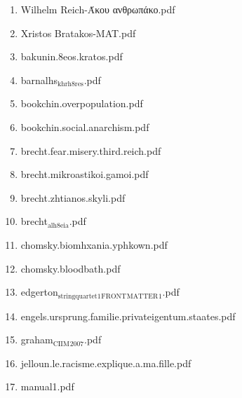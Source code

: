 \documentclass[11pt]{article}
\begin{document}
\begin{enumerate}
\begin{enumerate}
\item Wilhelm Reich-Άκου ανθρωπάκο.pdf
\label{sec-1-1-1-1-49-2-2-1-41}

\item Xristos Bratakos-MAT.pdf
\label{sec-1-1-1-1-49-2-2-1-42}

\item bakunin.8eos.kratos.pdf
\label{sec-1-1-1-1-49-2-2-1-43}

\item barnalhs$_{\text{khrh8res}}$.pdf
\label{sec-1-1-1-1-49-2-2-1-44}

\item bookchin.overpopulation.pdf
\label{sec-1-1-1-1-49-2-2-1-45}

\item bookchin.social.anarchism.pdf
\label{sec-1-1-1-1-49-2-2-1-46}

\item brecht.fear.misery.third.reich.pdf
\label{sec-1-1-1-1-49-2-2-1-47}

\item brecht.mikroastikoi.gamoi.pdf
\label{sec-1-1-1-1-49-2-2-1-48}

\item brecht.zhtianos.skyli.pdf
\label{sec-1-1-1-1-49-2-2-1-49}

\item brecht$_{\text{alh8eia}}$.pdf
\label{sec-1-1-1-1-49-2-2-1-50}

\item chomsky.biomhxania.yphkown.pdf
\label{sec-1-1-1-1-49-2-2-1-51}

\item chomsky.bloodbath.pdf
\label{sec-1-1-1-1-49-2-2-1-52}

\item edgerton$_{\text{stringquartet1}}$$_{\text{FRONT}}$$_{\text{MATTER}}$$_{\text{1}}$.pdf
\label{sec-1-1-1-1-49-2-2-1-53}

\item engels.ursprung.familie.privateigentum.staates.pdf
\label{sec-1-1-1-1-49-2-2-1-54}

\item graham$_{\text{CIIM}}$$_{\text{2007}}$.pdf
\label{sec-1-1-1-1-49-2-2-1-55}

\item jelloun.le.racisme.explique.a.ma.fille.pdf
\label{sec-1-1-1-1-49-2-2-1-56}

\item manual1.pdf
\label{sec-1-1-1-1-49-2-2-1-57}


\end{enumerate}
\end{enumerate}
\end{document}
